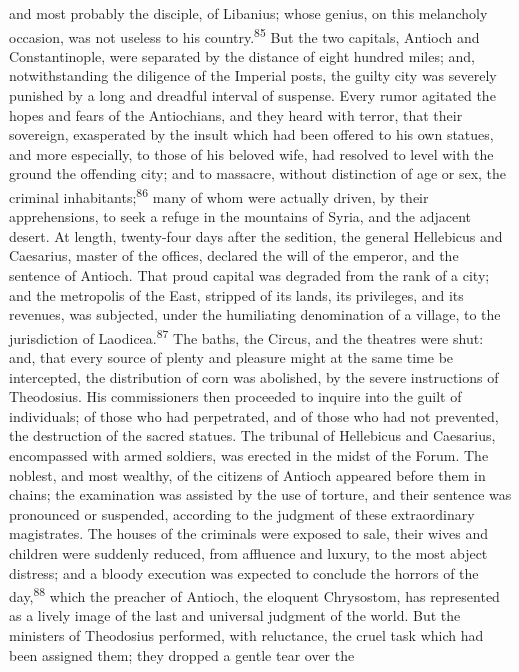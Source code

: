and most probably the disciple, of Libanius; whose genius, on
this melancholy occasion, was not useless to his country.\textsuperscript{85} But
the two capitals, Antioch and Constantinople, were separated by
the distance of eight hundred miles; and, notwithstanding the
diligence of the Imperial posts, the guilty city was severely
punished by a long and dreadful interval of suspense. Every rumor
agitated the hopes and fears of the Antiochians, and they heard
with terror, that their sovereign, exasperated by the insult
which had been offered to his own statues, and more especially,
to those of his beloved wife, had resolved to level with the
ground the offending city; and to massacre, without distinction
of age or sex, the criminal inhabitants;\textsuperscript{86} many of whom were
actually driven, by their apprehensions, to seek a refuge in the
mountains of Syria, and the adjacent desert. At length,
twenty-four days after the sedition, the general Hellebicus and
Caesarius, master of the offices, declared the will of the
emperor, and the sentence of Antioch. That proud capital was
degraded from the rank of a city; and the metropolis of the East,
stripped of its lands, its privileges, and its revenues, was
subjected, under the humiliating denomination of a village, to
the jurisdiction of Laodicea.\textsuperscript{87} The baths, the Circus, and the
theatres were shut: and, that every source of plenty and pleasure
might at the same time be intercepted, the distribution of corn
was abolished, by the severe instructions of Theodosius. His
commissioners then proceeded to inquire into the guilt of
individuals; of those who had perpetrated, and of those who had
not prevented, the destruction of the sacred statues. The
tribunal of Hellebicus and Caesarius, encompassed with armed
soldiers, was erected in the midst of the Forum. The noblest, and
most wealthy, of the citizens of Antioch appeared before them in
chains; the examination was assisted by the use of torture, and
their sentence was pronounced or suspended, according to the
judgment of these extraordinary magistrates. The houses of the
criminals were exposed to sale, their wives and children were
suddenly reduced, from affluence and luxury, to the most abject
distress; and a bloody execution was expected to conclude the
horrors of the day,\textsuperscript{88} which the preacher of Antioch, the
eloquent Chrysostom, has represented as a lively image of the
last and universal judgment of the world. But the ministers of
Theodosius performed, with reluctance, the cruel task which had
been assigned them; they dropped a gentle tear over the
